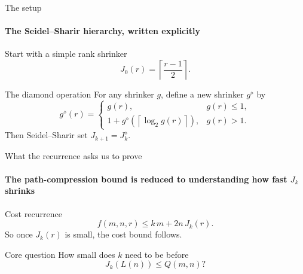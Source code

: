 \documentclass[aspectratio=169,11pt]{beamer}
\begin{document}
\begin{frame}{The setup}
\framesubtitle{The Seidel--Sharir hierarchy, written explicitly}
\begin{block}{Start with a simple rank shrinker}
\[
  J_0(r)=\left\lceil\frac{r-1}{2}\right\rceil.
\]
\end{block}

\begin{block}{The diamond operation}
For any shrinker $g$, define a new shrinker $g^\diamond$ by
\[
  g^\diamond(r)=
  \begin{cases}
    g(r), & g(r)\le 1,\\[0.15cm]
    1+g^\diamond\!\left(\left\lceil\log_2 g(r)\right\rceil\right), & g(r)>1.
  \end{cases}
\]
Then Seidel--Sharir set $J_{k+1}=J_k^\diamond$.
\end{block}
\end{frame}

\begin{frame}{What the recurrence asks us to prove}
\framesubtitle{The path-compression bound is reduced to understanding how fast $J_k$ shrinks}
\begin{center}
\end{center}
\vspace{0.25cm}
\begin{block}{Cost recurrence}
\[
  f(m,n,r) \le k\,m + 2n\,J_k(r).
\]
So once $J_k(r)$ is small, the cost bound follows.
\end{block}
\vspace{0.15cm}
\begin{block}{Core question}
\centering
How small does $k$ need to be before
\[
  J_k(L(n))\le Q(m,n)?
\]
\end{block}
\end{frame}
\end{document}
